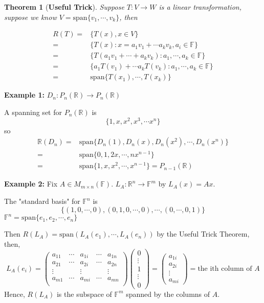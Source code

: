 \documentclass[12pt]{article}
\newtheorem{theorem}{Theorem}[subsection]
\newcommand{\Span}{\mathrm{span}}
\newcommand{\mR}{{\mathbb{R}}}
\newcommand{\mF}{{\mathbb{F}}}
\begin{document}
	\begin{theorem}[\textbf{Useful Trick}]
		Suppose $T : V \to W$ is a linear transformation, suppose we know 
		$V = \Span\{v_1, \cdots, v_k\}$, then 
		
		\begin{align*}
			R(T) 
			=& \{T(x), x\in V\}\\
			=& \{T(x): x = a_1v_1 + \cdots a_kv_k, a_i \in \mF\}\\
			=& \{T(a_1v_1+\cdots+a_kv_k): a_1, \cdots, a_k \in \mF\}\\
			=& \{a_1T(v_1) + \cdots a_kT(v_k): a_1, \cdots, a_k \in \mF\} \\
			=& \Span\{T(x_1), \cdots, T(x_k)\}
		\end{align*}
	\end{theorem}

	{\color{Brown}
	\textbf{Example 1: }
	$D_n:P_n(\mR) \to P_n(\mR)$ 

	A spanning set for $P_n(\mR)$ is 
	\[
		\{1, x, x^2, x^3, \cdots x^n\}
	\]
	so 
	\begin{align*}
		\mR(D_n)
		=& \Span \{D_n(1), D_n(x), D_n(x^2),\cdots,D_n(x^n)\}\\
		=& \Span \{0,1,2x,\cdots, nx^{n-1}\}\\
		=& \Span \{1, x, x^2, \cdots, x^{n-1}\}= P_{n-1}(\mR) 
	\end{align*}

	\textbf{Example 2: }
	Fix $A\in M_{m\times n} (\mF)$. $L_A : \mR^n \to \mF^m$ by $L_A(x) = Ax$. 

	The "standard basis" for $\mF^n$ is 
	\[
		\{(1,0,\cdots, 0), (0, 1, 0, \cdots, 0), \cdots, (0, \cdots, 0, 1)\}
	\]
	$\mF^n = \Span\{e_1, e_2, \cdots, e_n\}$ 
	
	Then $R(L_A) = \Span(L_A(e_1),\cdots, L_A(e_n))$ by the Useful Trick 
	Theorem, then, 
	\[
		L_A(e_i) = 
		\begin{pmatrix}
			a_{11} & \cdots & a_{1i} & \cdots & a_{1n} \\
			a_{21} & \cdots & a_{2i} & \cdots & a_{2n} \\
			\vdots & &\vdots & & \vdots \\
			a_{m1} & \cdots & a_{mi} & \cdots & a_{mn} \\
		\end{pmatrix}
		\begin{pmatrix}
			0\\
			\vdots\\
			1\\
			\vdots\\
			0
		\end{pmatrix}
		= 
		\begin{pmatrix}
			a_{1i}\\
			a_{2i}\\
			\vdots\\
			a_{mi}
		\end{pmatrix}
		= \text{the ith column of } A
	\]
	Hence, $R(L_A)$ is the subspace of $\mF^m$ spanned by the columns of $A$. 
}
\end{document}
